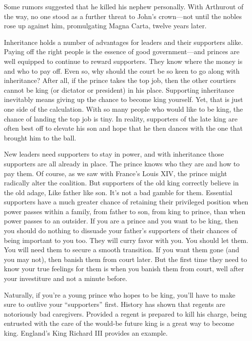 \documentclass[10pt]{article}
\begin{document}
{\large Some rumors suggested that he killed his nephew personally. With
Arthurout of the way, no one stood as a further threat to John's crown---not
until the nobles rose up against him, promulgating Magna Carta, twelve years
later.}

{\large Inheritance holds a number of advantages for leaders and their
supporters alike. Paying off the right people is the essence of good
government---and princes are well equipped to continue to reward supporters. They
know where the money is and who to pay off. Even so, why should the court be so
keen to go along with inheritance? After all, if the prince takes the top job,
then the other courtiers cannot be king (or dictator or president) in his place.
Supporting inheritance inevitably means giving up the chance to become king
yourself. Yet, that is just one side of the calculation. With so many people who
would like to be king, the chance of landing the top job is tiny. In reality,
supporters of the late king are often best off to elevate his son and hope that
he then dances with the one that brought him to the ball.}

{\large New leaders need supporters to stay in power, and with inheritance those
supporters are all already in place. The prince knows who they are and how to pay
them. Of course, as we saw with France's Louis XIV, the prince might radically
alter the coalition. But supporters of the old king correctly believe in the old
adage, Like father like son. It's not a bad gamble for them. Essential supporters
have a much greater chance of retaining their privileged position when power
passes within a family, from father to son, from king to prince, than when power
passes to an outsider. If you are a prince and you want to be king, then you
should do nothing to dissuade your father's supporters of their chances of being
important to you too. They will curry favor with you. You should let them. You
will need them to secure a smooth transition. If you want them gone (and you may
not), then banish them from court later. But the first time they need to know
your true feelings for them is when you banish them from court, well after your
investiture and not a minute before.}

{\large Naturally, if you're a young prince who hopes to be king, you'll have to
make sure to outlive your ``supporters'' first. History has shown that regents
are notoriously bad caregivers. Provided a regent is prepared to kill his charge,
being entrusted with the care of the would-be future king is a great way to
become king. England's King Richard III provides an example.}
\end{document}
